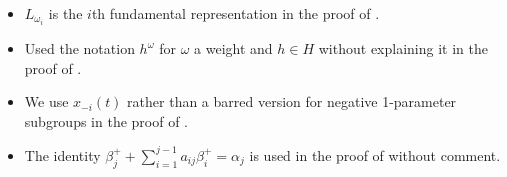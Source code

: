 \documentclass[11pt]{amsart}
\numberwithin{equation}{section}
\begin{document}
\begin{itemize}
  \item 
    $L_{\omega_i}$ is the $i$th fundamental representation in the proof of .

  \item 
    Used the notation $h^\omega$ for $\omega$ a weight and $h \in H$ without explaining it in the proof of .

  \item 
    We use $x_{-i}(t)$ rather than a barred version for negative 1-parameter subgroups in the proof of .

  \item 
    The identity $\beta_j^+ + \sum_{i=1}^{j-1} a_{ij} \beta_i^+ = \alpha_j$ is used in the proof of  without comment.
\end{itemize}



\end{document}

